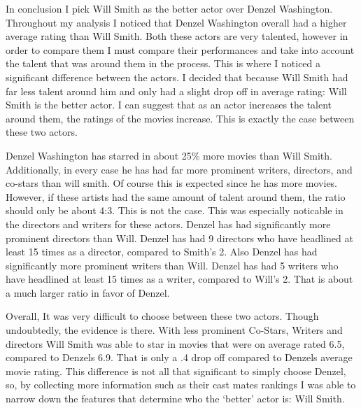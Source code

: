 \documentclass[]{article}
\begin{document}
\noindent In conclusion I pick Will Smith as the better actor over
Denzel Washington. Throughout my analysis I noticed that Denzel
Washington overall had a higher average rating than Will Smith. Both
these actors are very talented, however in order to compare them I must
compare their performances and take into account the talent that was
around them in the process. This is where I noticed a significant
difference between the actors. I decided that because Will Smith had far
less talent around him and only had a slight drop off in average rating:
Will Smith is the better actor. I can suggest that as an actor increases
the talent around them, the ratings of the movies increase. This is
exactly the case between these two actors.

\vspace{7mm}

\noindent Denzel Washington has starred in about 25\% more movies than
Will Smith. Additionally, in every case he has had far more prominent
writers, directors, and co-stars than will smith. Of course this is
expected since he has more movies. However, if these artists had the
same amount of talent around them, the ratio should only be about 4:3.
This is not the case. This was especially noticable in the directors and
writers for these actors. Denzel has had significantly more prominent
directors than Will. Denzel has had 9 directors who have headlined at
least 15 times as a director, compared to Smith's 2. Also Denzel has had
significantly more prominent writers than Will. Denzel has had 5 writers
who have headlined at least 15 times as a writer, compared to Will's 2.
That is about a much larger ratio in favor of Denzel.

\vspace{7mm}

\noindent Overall, It was very difficult to choose between these two
actors. Though undoubtedly, the evidence is there. With less prominent
Co-Stars, Writers and directors Will Smith was able to star in movies
that were on average rated 6.5, compared to Denzels 6.9. That is only a
.4 drop off compared to Denzels average movie rating. This difference is
not all that significant to simply choose Denzel, so, by collecting more
information such as their cast mates rankings I was able to narrow down
the features that determine who the `better' actor is: Will Smith.






\newpage
\theendnotes

\newpage
\begin{auxmulticols}{2}
\singlespacing 


\end{auxmulticols}

\newpage
\end{document}
